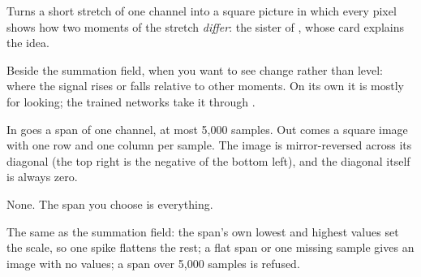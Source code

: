Turns a short stretch of one channel into a square picture in which every pixel shows how
two moments of the stretch \emph{differ}: the sister of ,
whose card explains the idea.

Beside the summation field, when you want to see change rather than level: where the
signal rises or falls relative to other moments. On its own it is mostly for looking; the
trained networks take it through .

In goes a span of one channel, at most 5{,}000 samples. Out comes a square image with one
row and one column per sample. The image is mirror-reversed across its diagonal (the top
right is the negative of the bottom left), and the diagonal itself is always zero.

None. The span you choose is everything.

The same as the summation field: the span's own lowest and highest values set the scale,
so one spike flattens the rest; a flat span or one missing sample gives an image with no
values; a span over 5{,}000 samples is refused.

